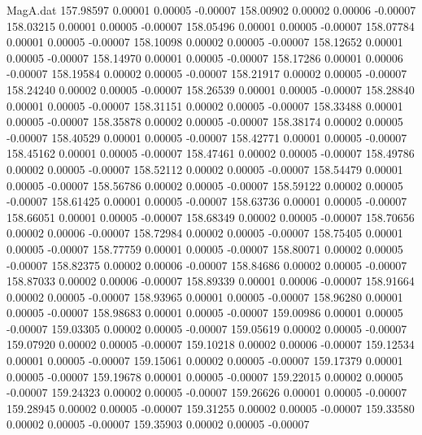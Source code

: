 \begin{filecontents}{MagA.dat}
 157.98597    0.00001    0.00005   -0.00007
 158.00902    0.00002    0.00006   -0.00007
 158.03215    0.00001    0.00005   -0.00007
 158.05496    0.00001    0.00005   -0.00007
 158.07784    0.00001    0.00005   -0.00007
 158.10098    0.00002    0.00005   -0.00007
 158.12652    0.00001    0.00005   -0.00007
 158.14970    0.00001    0.00005   -0.00007
 158.17286    0.00001    0.00006   -0.00007
 158.19584    0.00002    0.00005   -0.00007
 158.21917    0.00002    0.00005   -0.00007
 158.24240    0.00002    0.00005   -0.00007
 158.26539    0.00001    0.00005   -0.00007
 158.28840    0.00001    0.00005   -0.00007
 158.31151    0.00002    0.00005   -0.00007
 158.33488    0.00001    0.00005   -0.00007
 158.35878    0.00002    0.00005   -0.00007
 158.38174    0.00002    0.00005   -0.00007
 158.40529    0.00001    0.00005   -0.00007
 158.42771    0.00001    0.00005   -0.00007
 158.45162    0.00001    0.00005   -0.00007
 158.47461    0.00002    0.00005   -0.00007
 158.49786    0.00002    0.00005   -0.00007
 158.52112    0.00002    0.00005   -0.00007
 158.54479    0.00001    0.00005   -0.00007
 158.56786    0.00002    0.00005   -0.00007
 158.59122    0.00002    0.00005   -0.00007
 158.61425    0.00001    0.00005   -0.00007
 158.63736    0.00001    0.00005   -0.00007
 158.66051    0.00001    0.00005   -0.00007
 158.68349    0.00002    0.00005   -0.00007
 158.70656    0.00002    0.00006   -0.00007
 158.72984    0.00002    0.00005   -0.00007
 158.75405    0.00001    0.00005   -0.00007
 158.77759    0.00001    0.00005   -0.00007
 158.80071    0.00002    0.00005   -0.00007
 158.82375    0.00002    0.00006   -0.00007
 158.84686    0.00002    0.00005   -0.00007
 158.87033    0.00002    0.00006   -0.00007
 158.89339    0.00001    0.00006   -0.00007
 158.91664    0.00002    0.00005   -0.00007
 158.93965    0.00001    0.00005   -0.00007
 158.96280    0.00001    0.00005   -0.00007
 158.98683    0.00001    0.00005   -0.00007
 159.00986    0.00001    0.00005   -0.00007
 159.03305    0.00002    0.00005   -0.00007
 159.05619    0.00002    0.00005   -0.00007
 159.07920    0.00002    0.00005   -0.00007
 159.10218    0.00002    0.00006   -0.00007
 159.12534    0.00001    0.00005   -0.00007
 159.15061    0.00002    0.00005   -0.00007
 159.17379    0.00001    0.00005   -0.00007
 159.19678    0.00001    0.00005   -0.00007
 159.22015    0.00002    0.00005   -0.00007
 159.24323    0.00002    0.00005   -0.00007
 159.26626    0.00001    0.00005   -0.00007
 159.28945    0.00002    0.00005   -0.00007
 159.31255    0.00002    0.00005   -0.00007
 159.33580    0.00002    0.00005   -0.00007
 159.35903    0.00002    0.00005   -0.00007

\end{filecontents}
